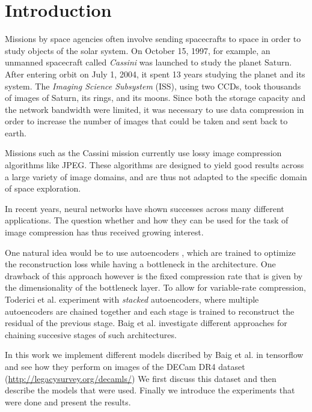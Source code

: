 \section{Introduction}

Missions by space agencies often involve sending spacecrafts to space in order to study objects of the solar system. On October 15, 1997, for example, an unmanned spacecraft called \emph{Cassini} was launched to study the planet Saturn. After entering orbit on July 1, 2004, it spent 13 years studying the planet and its system. The \emph{Imaging Science Subsystem} (ISS), using two CCDs, took thousands of images of Saturn, its rings, and its moons. Since both the storage capacity and the network bandwidth were limited, it was necessary to use data compression in order to increase the number of images that could be taken and sent back to earth.

Missions such as the Cassini mission currently use lossy image compression algorithms like JPEG. These algorithms are designed to yield good results across a large variety of image domains, and are thus not adapted to the specific domain of space exploration. 

In recent years, neural networks have shown successes across many different applications. The question whether and how they can be used for the task of image compression has thus received growing interest.

One natural idea would be to use autoencoders \cite{DBLP:conf/esann/KrizhevskyH11}, which are trained to optimize the reconstruction loss while having a bottleneck in the architecture. One drawback of this approach however is the fixed compression rate that is given by the dimensionality of the bottleneck layer. To allow for variable-rate compression, Toderici et al. \cite{DBLP:journals/corr/TodericiOHVMBCS15} \cite{DBLP:journals/corr/TodericiVJHMSC16} experiment with \emph{stacked} autoencoders, where multiple autoencoders are chained together and each stage is trained to reconstruct the residual of the previous stage. Baig et al. \cite{DBLP:journals/corr/abs-1709-08855} investigate different approaches for chaining succesive stages of such architectures.

In this work we implement different models discribed by Baig et al. \cite{DBLP:journals/corr/abs-1709-08855} in tensorflow and see how they perform on images of the DECam DR4 dataset (\url{http://legacysurvey.org/decamls/}) We first discuss this dataset and then describe the models that were used. Finally we introduce the experiments that were done and present the results.